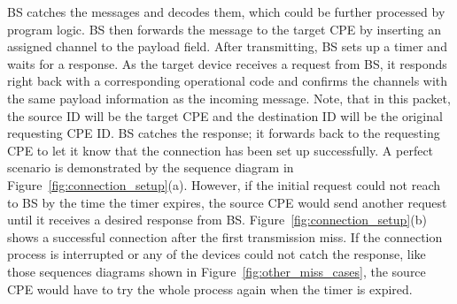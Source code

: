 BS catches the messages and decodes them, which could be further processed by program logic. BS then forwards the message to the target
CPE by inserting an assigned channel to the payload field. After transmitting, BS sets up a timer and waits for a response. As the target
device receives a request from BS, it responds right back with a corresponding operational code and confirms the channels with the same payload
information as the incoming message. Note, that in this packet, the source ID will be the target CPE and the destination ID will be the 
original requesting CPE ID. BS catches the response; it forwards back to the requesting CPE to let it know that the connection has been set up
successfully. A perfect scenario is demonstrated by the sequence diagram in Figure~\ref{fig:connection_setup}(a). However, if the initial 
request could not reach to BS by the time the timer expires, the source CPE would send another request until it receives a desired response from
BS. Figure~\ref{fig:connection_setup}(b) shows a successful connection after the first transmission miss. If the connection process is interrupted or
any of the devices could not catch the response, like those sequences diagrams shown in Figure~\ref{fig:other_miss_cases}, the source CPE would
have to try the whole process again when the timer is expired.
